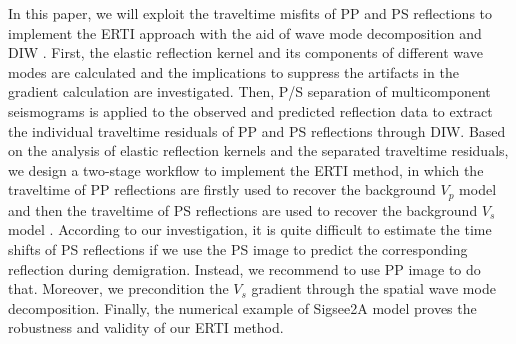 \documentclass[extra,mreferee]{gji}
\begin{document}



In this paper,
we will exploit the traveltime misfits of PP and PS reflections to implement the ERTI
approach with the aid
of wave mode decomposition and DIW \cite[]{Hale2013}.
First,
the elastic reflection kernel and its components of different wave modes are
calculated and the implications to suppress the artifacts in the gradient calculation
are investigated.
Then, P/S separation of multicomponent seismograms is applied to the observed and predicted reflection data
to extract the individual traveltime residuals of PP and PS reflections through DIW.
Based on the analysis of elastic reflection kernels and the separated traveltime residuals,
we design a two-stage workflow to implement
the ERTI method,
in which the traveltime of PP reflections are firstly used to recover the background
$V_p$ model and then the traveltime of PS reflections are used to recover the background $V_s$ model
.
According to our investigation, it is quite difficult to estimate the time shifts of PS reflections if we
use the PS image to predict the corresponding reflection during demigration.
Instead, we recommend to use PP image to do that.
Moreover, we precondition the $V_s$ gradient through the spatial wave mode
decomposition.
Finally, the numerical example of Sigsee2A model proves the robustness and validity of our
ERTI method.
\end{document}
